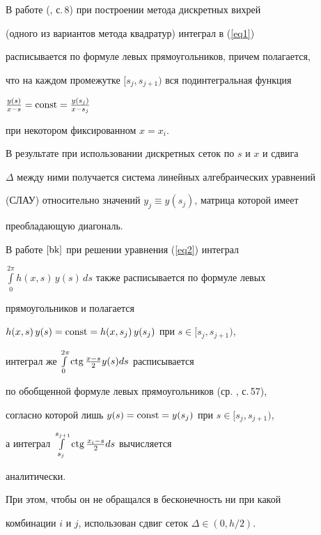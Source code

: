 \begin{alg}


В работе (\cite{bl}, с.\,8) при построении метода дискретных вихрей


(одного из вариантов метода квадратур) интеграл в (\ref{eq1})


расписывается по формуле левых прямоугольников, причем полагается,


что на каждом промежутке $[s_j,s_{j+1})$ вся подинтегральная функция


$\frac{y(s)}{x-s}=\operatorname{const}=\frac{y(s_j)}{x-s_j}$


при некотором фиксированном $x=x_i$.


В результате при использовании дискретных сеток по $s$ и $x$ и сдвига


$\Delta$ между ними получается система линейных алгебраических уравнений


(СЛАУ) относительно значений $y_j\equiv y(s_j)$, матрица которой имеет


преобладающую диагональ.


В работе $\cite{bk}$ при решении уравнения (\ref{eq2}) интеграл


$\int\limits_0^{2\pi}h(x,s)\,y(s)\,ds$ также расписывается по формуле левых


прямоугольников и полагается


$h(x,s)\,y(s)=\operatorname{const}=h(x,s_j)\,y(s_j)$ при $s\in[s_j,s_{j+1})$,


интеграл же $\int\limits_0^{2\pi}\operatorname{ctg}\frac{x-s}2y(s)ds$ расписывается


по обобщенной формуле левых прямоугольников (ср. \cite{ksh}, с.\,57),


согласно которой лишь $y(s)=\operatorname{const}=y(s_j)$ при $s\in[s_j,s_{j+1})$,


а интеграл $\int\limits_{s_j}^{s_{j+1}}\operatorname{ctg}\frac{x_i-s}2ds$ вычисляется


аналитически.


При этом, чтобы он не обращался в бесконечность ни при какой


комбинации $i$ и $j$, использован сдвиг сеток $\Delta\in(0,h/2)$.


\end{alg}





